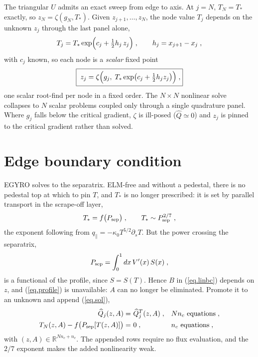 \documentclass[12pt]{article}
\newcommand\vpr{V^\prime}
\newcommand\qhat{\widehat{Q}}
\begin{document}
The triangular $U$ admits an exact sweep from edge to axis.  At $j=N$,
$T_N = T_*$ exactly, so $z_N = \zeta(g_N, T_*)$.  Given $z_{j+1},\dots,z_N$,
the node value $T_j$ depends on the unknown $z_j$ through the last panel
alone,
%
\begin{equation}
T_j = T_* \exp\Bigl( c_j + \tfrac{1}{2} h_j \, z_j \Bigr) \; ,
\qquad
h_j = x_{j+1} - x_j \; ,
\end{equation}
%
with $c_j$ known, so each node is a \emph{scalar} fixed point
%
\begin{equation}
\boxed{\;
z_j = \zeta\Bigl( g_j,\; T_* \exp\bigl( c_j + \tfrac{1}{2} h_j z_j \bigr)
 \Bigr) \; , }
\label{eq.sweep}
\end{equation}
%
one scalar root-find per node in a fixed order.  The $N \times N$
nonlinear solve collapses to $N$ scalar problems coupled only through a
single quadrature panel.  Where $g_j$ falls below the critical gradient,
$\zeta$ is ill-posed ($\qhat \simeq 0$) and $z_j$ is pinned to the
critical gradient rather than solved.

\section{Edge boundary condition}

EGYRO solves to the separatrix.  ELM-free and without a pedestal, there
is no pedestal top at which to pin $T$, and $T_*$ is no longer
prescribed: it is set by parallel transport in the scrape-off layer,
%
\begin{equation}
T_* = f \bigl( P_{\rm sep} \bigr) \; ,
\qquad
T_* \sim P_{\rm sep}^{2/7} \; ,
\label{eq.sol}
\end{equation}
%
the exponent following from $q_\parallel = -\kappa_0 T^{5/2} \partial_s
T$.  But the power crossing the separatrix,
%
\begin{equation}
P_{\rm sep} = \int_0^1 dx \, \vpr(x) \, S(x) \; ,
\end{equation}
%
is a functional of the profile, since $S = S(T)$.  Hence $B$ in
(\ref{eq.linbc}) depends on $z$, and (\ref{eq.profile}) is unavailable:
$A$ can no longer be eliminated.  Promote it to an unknown and append
(\ref{eq.sol}),
%
\begin{align}
\qhat_j(z,A) = &~ \qhat^T_j(z,A) \; ,
 && N n_c \ \text{equations} \; , \\
T_N(z,A) - f \bigl( P_{\rm sep}[T(z,A)] \bigr)
 = &~ 0 \; , && n_c \ \text{equations} \; ,
\label{eq.augmented}
\end{align}
%
with $(z,A) \in \mathbb{R}^{N n_c + n_c}$.  The appended rows require no
flux evaluation, and the $2/7$ exponent makes the added nonlinearity
weak.
\end{document}
